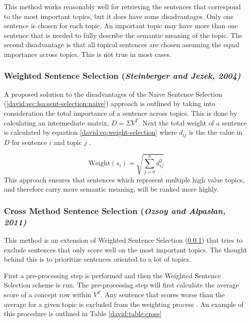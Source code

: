 \documentclass[../writeup.tex]{subfiles}
\begin{document}
This method works reasonably well for retrieving the sentences that correspond to the most important topics, but it does have some disadvantages. Only one sentence is chosen for each topic. An important topic may have more than one sentence that is needed to fully describe the semantic meaning of the topic. 
The second disadvantage is that all topical sentences are chosen assuming the equal importance across topics. This is not true in most cases.


\subsubsection{Weighted Sentence Selection (\emph{Steinberger and Jezek, 2004)}}\label{david:sec:lsa:sent-selection:weight}

A proposed solution to the disadvantages of the Naive Sentence Selection (\ref{david:sec:lsa:sent-selection:naive}) approach is outlined by taking into consideration the total importance of a sentence across topics. This is done by calculating an intermediate matrix, $D = \Sigma V^T$. Next the total weight of a sentence is calculated by equation \eqref{david:eq:weight-selection} where $d_{ij}$ is the the value in $D$ for sentence $i$ and topic $j$ \autocite{lsa-implementation-weighting}.

\begin{equation}\label{david:eq:weight-selection}
    \text{Weight}(s_i)= \sqrt{\sum_{j=0}^n d_{ij}^2}
\end{equation}
This approach ensures that sentences which represent multiple high value topics, and therefore carry more semantic meaning, will be ranked more highly.

\subsubsection{Cross Method Sentence Selection (\emph{Ozsoy and Alpaslan, 2011)}} \label{david:sec:lsa:sent-selection:cross}

This method is an extension of Weighted Sentence Selection (\ref{david:sec:lsa:sent-selection:weight}) that tries to exclude sentences that only score well on the most important topics. The thought behind this is to prioritize sentences oriented to a lot of topics.

First a pre-processing step is performed and then the Weighted Sentence Selection scheme is run. The pre-processing step will first calculate the average score of a concept row within $V^T$. Any sentence that scores worse than the average for a given topic is excluded from the weighting process \autocite{lsa-overview}. An example of this procedure is outlined in Table \ref{david:table:cross}
\end{document}
